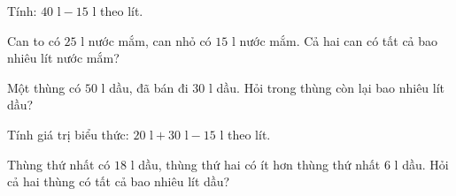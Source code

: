\begin{ex} %
Tính: $40\text{ l} - 15\text{ l}$ theo lít.
\end{ex}

\begin{ex} %
Can to có $25\text{ l}$ nước mắm, can nhỏ có $15\text{ l}$ nước mắm. Cả hai can có tất cả bao nhiêu lít nước mắm?
\end{ex}

\begin{ex} %
Một thùng có $50\text{ l}$ dầu, đã bán đi $30\text{ l}$ dầu. Hỏi trong thùng còn lại bao nhiêu lít dầu?
\end{ex}

\begin{ex} %
Tính giá trị biểu thức: $20\text{ l} + 30\text{ l} - 15\text{ l}$ theo lít.
\end{ex}

\begin{ex} %
Thùng thứ nhất có $18\text{ l}$ dầu, thùng thứ hai có ít hơn thùng thứ nhất $6\text{ l}$ dầu. Hỏi cả hai thùng có tất cả bao nhiêu lít dầu?
\end{ex}
